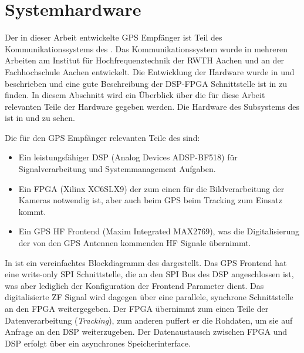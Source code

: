 \section{Systemhardware}
Der in dieser Arbeit entwickelte GPS Empfänger ist Teil des Kommunikationssystems des \dscubesat. Das Kommunikationssystem wurde in mehreren Arbeiten am Institut für Hochfrequenztechnik der RWTH Aachen und an der Fachhochschule Aachen entwickelt. Die Entwicklung der \comboard Hardware wurde in \cite{DragsailKaiMA} und \cite{DragsailMattiMA} beschrieben und eine gute Beschreibung der DSP-FPGA Schnittstelle ist in \cite{DragsailAndrejMA} zu finden.
In diesem Abschnitt wird ein Überblick über die für diese Arbeit relevanten Teile der \comboard Hardware gegeben werden. Die Hardware des \comboard Subsystems des \dscubesat ist in  und  zu sehen. 

Die für den GPS Empfänger relevanten Teile des \comboard sind: 
\begin{itemize}
\item Ein leistungsfähiger \gls{DSP} (Analog Devices ADSP-BF518) für Signalverarbeitung und Systemmanagement Aufgaben.
\item Ein \gls{FPGA} (Xilinx XC6SLX9) der zum einen für die Bildverarbeitung der Kameras notwendig ist, aber auch beim GPS beim Tracking zum Einsatz kommt.
\item Ein GPS HF Frontend (Maxim Integrated MAX2769), was die Digitalisierung der von den GPS Antennen kommenden HF Signale übernimmt.
\end{itemize}



In  ist ein vereinfachtes Blockdiagramm des \comboard dargestellt. Das GPS Frontend hat eine write-only SPI Schnittstelle, die an den SPI Bus des DSP angeschlossen ist, was aber lediglich der Konfiguration der Frontend Parameter dient. Das digitalisierte \gls{ZF} Signal wird dagegen über eine parallele, synchrone Schnittstelle an den FPGA weitergegeben. Der FPGA übernimmt zum einen Teile der Datenverarbeitung (\emph{Tracking}), zum anderen puffert er die Rohdaten, um sie auf Anfrage an den DSP weiterzugeben. Der Datenaustausch zwischen FPGA und DSP erfolgt über ein asynchrones Speicherinterface. 



